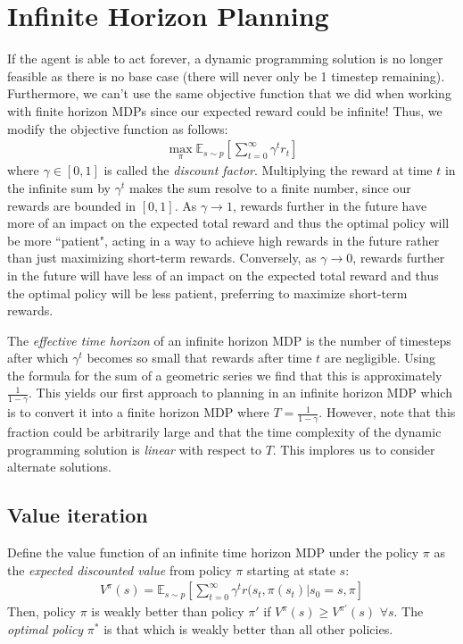 \section{Infinite Horizon Planning}
If the agent is able to act forever, a dynamic programming solution is no longer feasible as there is no base case (there will never only be 1 timestep remaining). Furthermore, we can't use the same objective function that we did when working with finite horizon MDPs since our expected reward could be infinite! Thus, we modify the objective function as follows:
\begin{align*}
    \max_{\pi}\mathbb{E}_{s \sim p}\left[\sum_{t=0}^{\infty} \gamma^tr_{t}\right]
\end{align*}
where $\gamma \in [0, 1]$ is called the \textit{discount factor}. Multiplying the reward at time $t$ in the infinite sum by $\gamma^t$ makes the sum resolve to a finite number, since our rewards are bounded in $[0, 1]$. As $\gamma \rightarrow 1$, rewards further in the future have more of an impact on the expected total reward and thus the optimal policy will be more ``patient", acting in a way to achieve high rewards in the future rather than just maximizing short-term rewards. Conversely, as $\gamma \rightarrow 0$, rewards further in the future will have less of an impact on the expected total reward and thus the optimal policy will be less patient, preferring to maximize short-term rewards. 

The \textit{effective time horizon} of an infinite horizon MDP is the number of timesteps after which $\gamma^t$ becomes so small that rewards after time $t$ are negligible. Using the formula for the sum of a geometric series we find that this is approximately $\frac{1}{1 - \gamma}$. This yields our first approach to planning in an infinite horizon MDP which is to convert it into a finite horizon MDP where $T = \frac{1}{1 - \gamma}$. However, note that this fraction could be arbitrarily large and that the time complexity of the dynamic programming solution is \textit{linear} with respect to $T$. This implores us to consider alternate solutions.

\subsection{Value iteration}
Define the value function of an infinite time horizon MDP under the policy $\pi$ as the \textit{expected discounted value} from policy $\pi$ starting at state $s$:
\begin{align*}
    V^{\pi}(s) = \mathbb{E}_{s \sim p}\left[\sum_{t = 0}^\infty \gamma^t r(s_t, \pi(s_t)|s_0 = s, \pi\right]
\end{align*}
Then, policy $\pi$ is weakly better than policy $\pi'$ if $V^{\pi}(s) \geq V^{\pi'}(s)$ $\forall s$. The \textit{optimal policy} $\pi^*$ is that which is weakly better than all other policies.\\

